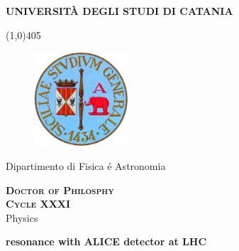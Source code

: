 \begin{titlepage}

\begin{center}
\begin{large}
\textbf{UNIVERSIT\`A DEGLI STUDI DI CATANIA} \\
\end{large}
\end{center}

\line(1,0){405} \\

\begin{figure}[htbp]
\begin{center}
\includegraphics[angle=0, height=3.5cm]{Images/Logo.jpg}
\end{center}
\end{figure}

\begin{center}
\begin{large}
Dipartimento di Fisica \'e Astronomia \\
\end{large}
\end{center}

\vspace{3pt}

\begin{center}
\begin{normalsize}
\textsc{ \bf Doctor of Philosphy} \\
\vspace{2pt} 
\textsc{\bf Cycle XXXI} \\
\vspace{3pt} 
Physics\\
\end{normalsize}
\end{center}

\vspace{2.0cm}
 
\begin{LARGE}
\begin{center}
\textbf{\kstarch resonance with ALICE detector at LHC}
\end{center}
\end{LARGE}


\end{titlepage}
